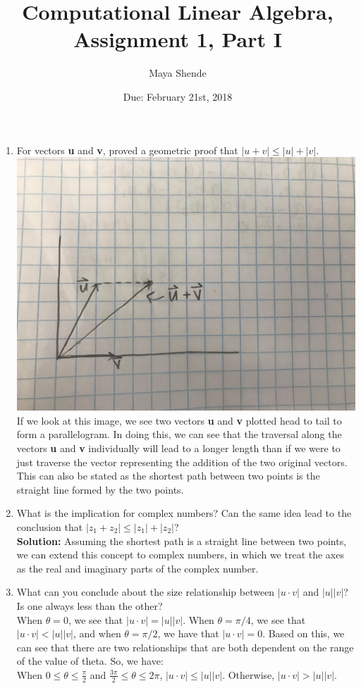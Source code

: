 \documentclass{article}
\title{Computational Linear Algebra, Assignment 1, Part I}
\author{Maya Shende}
\date{Due: February 21st, 2018}
\begin{document}
\maketitle

\begin{enumerate}

	\item For vectors \textbf{u} and \textbf{v}, proved a geometric proof that $|u + v| \leq |u| +|v|$. \\
	\includegraphics[scale=0.05]{problem2}\\
	If we look at this image, we see two vectors \textbf{u} and \textbf{v} plotted head to tail to form a parallelogram. In doing this, we can see that the traversal along the vectors \textbf{u} and \textbf{v}  individually will lead to a longer length than if we were to just traverse the vector representing the addition of the two original vectors. This can also be stated as the shortest path between two points is the straight line formed by the two points. 
	
	\item What is the implication for complex numbers? Can the same idea lead to the conclusion that $|z_1 + z_2| \leq |z_1| + |z_2|$? \\
	\textbf{Solution: } Assuming the shortest path is a straight line between two points, we can extend this concept to complex numbers, in which we treat the axes as the real and imaginary parts of the complex number.
	
	\item What can you conclude about the size relationship between $|u \cdot v|$ and $|u||v|$? Is one always less than the other?\\
	When $\theta = 0$, we see that $|u \cdot v| = |u||v|$. When $\theta = \pi / 4$, we see that $|u \cdot v| < |u||v|$, and when $\theta = \pi / 2$, we have that $|u \cdot v| = 0$. Based on this, we can see that there are two relationships that are both dependent on the range of the value of theta. So, we have: \\
	When $0 \leq \theta \leq \frac{\pi}{2}$ and $\frac{3\pi}{2} \leq \theta \leq 2\pi$, $|u \cdot v| \leq |u||v|$. Otherwise, $|u \cdot v| > |u||v|$. 


\end{enumerate}
\end{document}
